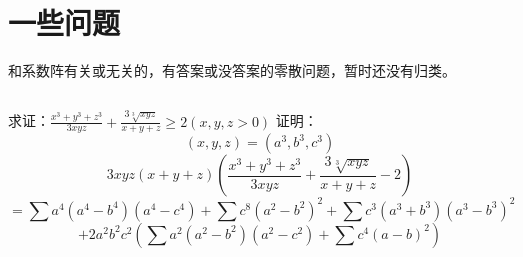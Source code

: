 \documentclass[UTF8]{ctexart}
\begin{document}
\section{一些问题}
和系数阵有关或无关的，有答案或没答案的零散问题，暂时还没有归类。
\subsection{}
求证：$ \displaystyle \frac{x^{3}+y^{3}+z^{3}}{3 x y z}+\displaystyle \frac{3 \sqrt[3]{x y z}}{x+y+z} \geq 2(x, y, z>0) $
证明：
$$ (x, y, z)=\left(a^{3}, b^{3}, c^{3}\right) $$
$$3 x y z(x+y+z)\left(\displaystyle \frac{x^{3}+y^{3}+z^{3}}{3 x y z}+\displaystyle \frac{3 \sqrt[3]{x y z}}{x+y+z}-2\right) $$
$$ =\displaystyle \sum a^{4}\left(a^{4}-b^{4}\right)\left(a^{4}-c^{4}\right)+\displaystyle \sum c^{8}\left(a^{2}-b^{2}\right)^{2}+\displaystyle \sum c^{3}\left(a^{3}+b^{3}\right)\left(a^{3}-b^{3}\right)^{2} $$
$$ +2 a^{2} b^{2} c^{2}\left(\displaystyle \sum a^{2}\left(a^{2}-b^{2}\right)\left(a^{2}-c^{2}\right)+\displaystyle \sum c^{4}(a-b)^{2}\right) $$
\end{document}

